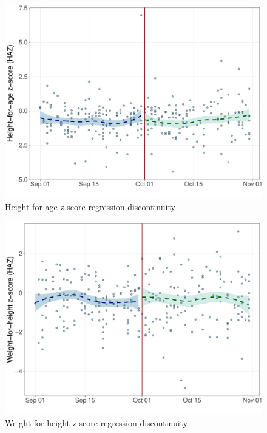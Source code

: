 \documentclass[12pt,a4paper]{article}
\begin{document}
\begin{figure}[H]

{\centering \includegraphics{kayinReport_files/figure-latex/rd3-1} 

}

\caption{Height-for-age z-score regression discontinuity}\label{fig:rd3}
\end{figure}

\begin{figure}[H]

{\centering \includegraphics{kayinReport_files/figure-latex/rd4-1} 

}

\caption{Weight-for-height z-score regression discontinuity}\label{fig:rd4}
\end{figure}
\end{document}
